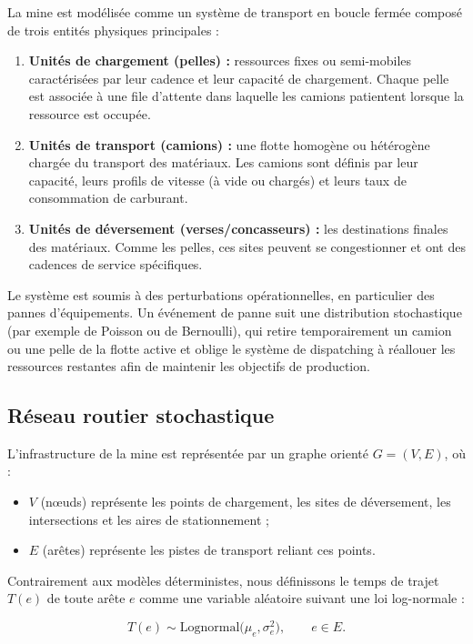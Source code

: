 \documentclass[11pt,a4paper]{article}
\begin{document}
La mine est modélisée comme un système de transport en boucle fermée composé de trois entités physiques principales :

\begin{enumerate}
  \item \textbf{Unités de chargement (pelles) :} ressources fixes ou semi-mobiles caractérisées par leur cadence et leur capacité de chargement. Chaque pelle est associée à une file d'attente dans laquelle les camions patientent lorsque la ressource est occupée.
  \item \textbf{Unités de transport (camions) :} une flotte homogène ou hétérogène chargée du transport des matériaux. Les camions sont définis par leur capacité, leurs profils de vitesse (à vide ou chargés) et leurs taux de consommation de carburant.
  \item \textbf{Unités de déversement (verses/concasseurs) :} les destinations finales des matériaux. Comme les pelles, ces sites peuvent se congestionner et ont des cadences de service spécifiques.
\end{enumerate}

Le système est soumis à des perturbations opérationnelles, en particulier des pannes d'équipements. Un événement de panne suit une distribution stochastique (par exemple de Poisson ou de Bernoulli), qui retire temporairement un camion ou une pelle de la flotte active et oblige le système de dispatching à réallouer les ressources restantes afin de maintenir les objectifs de production.

\subsection{Réseau routier stochastique}

L'infrastructure de la mine est représentée par un graphe orienté $G = (V, E)$, où :

\begin{itemize}
  \item $V$ (nœuds) représente les points de chargement, les sites de déversement, les intersections et les aires de stationnement ;
  \item $E$ (arêtes) représente les pistes de transport reliant ces points.
\end{itemize}

Contrairement aux modèles déterministes, nous définissons le temps de trajet $T(e)$ de toute arête $e$ comme une variable aléatoire suivant une loi log-normale :

\begin{equation}
T(e) \sim \mathrm{Lognormal}\big(\mu_e, \sigma_e^2\big), \qquad e \in E .
\end{equation}
\end{document}
